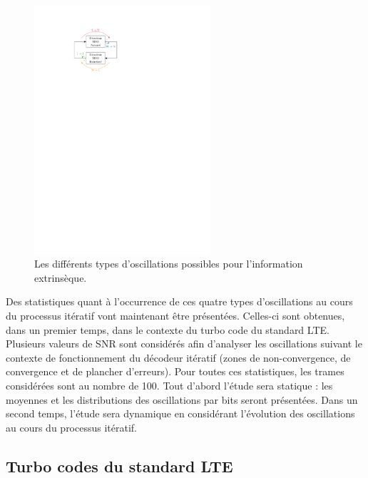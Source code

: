\begin{figure}[tb]
	\centering
	\includegraphics[width=6.5cm]{main/ch2_fig/ipe/osc.pdf}
	\caption{\label{fig:osc}Les différents types d'oscillations possibles pour l'information extrinsèque.}
\end{figure}

Des statistiques quant à l’occurrence de ces quatre types d'oscillations au cours du processus itératif vont maintenant être 
présentées. Celles-ci sont obtenues, dans un premier temps, dans le contexte du turbo code du standard LTE.
Plusieurs valeurs de SNR sont considérés afin d'analyser les oscillations suivant le contexte de fonctionnement du 
décodeur itératif (zones de non-convergence, de convergence et de plancher d'erreurs). Pour toutes ces statistiques, les 
trames considérées sont au nombre de 100. Tout d'abord l'étude sera statique : les moyennes et les distributions des 
oscillations par bits seront présentées. Dans un second temps, l'étude sera dynamique en considérant l'évolution des 
oscillations au cours du processus itératif.

\subsection{Turbo codes du standard LTE}
